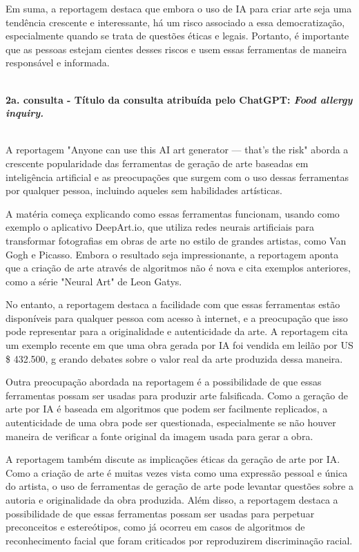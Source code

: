 Em suma, a reportagem destaca que embora o uso de IA para criar arte seja uma tendência crescente e interessante, 
há um risco associado a essa democratização, especialmente quando se trata de questões éticas e legais. 
Portanto, é importante que as pessoas estejam cientes desses riscos e usem essas ferramentas de maneira responsável e informada.

~\\ 

\textbf{2a. consulta - Título da consulta atribuída pelo ChatGPT: \textit{Food allergy inquiry.}}

~\\

A reportagem "Anyone can use this AI art generator — that's the risk" aborda a crescente 
popularidade das ferramentas de geração de arte baseadas em inteligência artificial e as 
preocupações que surgem com o uso dessas ferramentas por qualquer pessoa, incluindo aqueles sem habilidades artísticas.

A matéria começa explicando como essas ferramentas funcionam, usando como exemplo o aplicativo DeepArt.io, 
que utiliza redes neurais artificiais para transformar fotografias em obras de arte no estilo de grandes artistas, 
como Van Gogh e Picasso. Embora o resultado seja impressionante, a reportagem aponta que a criação de arte através 
de algoritmos não é nova e cita exemplos anteriores, como a série "Neural Art" de Leon Gatys.

No entanto, a reportagem destaca a facilidade com que essas ferramentas estão disponíveis para qualquer pessoa 
com acesso à internet, e a preocupação que isso pode representar para a originalidade e autenticidade da arte. 
A reportagem cita um exemplo recente em que uma obra gerada por IA foi vendida em leilão por US \$ 432.500, g
erando debates sobre o valor real da arte produzida dessa maneira.

Outra preocupação abordada na reportagem é a possibilidade de que essas ferramentas possam ser usadas para 
produzir arte falsificada. Como a geração de arte por IA é baseada em algoritmos que podem ser facilmente replicados, 
a autenticidade de uma obra pode ser questionada, especialmente se não houver maneira de verificar a fonte original 
da imagem usada para gerar a obra.

A reportagem também discute as implicações éticas da geração de arte por IA. Como a criação de arte é muitas vezes 
vista como uma expressão pessoal e única do artista, o uso de ferramentas de geração de arte pode levantar 
questões sobre a autoria e originalidade da obra produzida. Além disso, a reportagem destaca a possibilidade 
de que essas ferramentas possam ser usadas para perpetuar preconceitos e estereótipos, como já ocorreu em 
casos de algoritmos de reconhecimento facial que foram criticados por reproduzirem discriminação racial.

